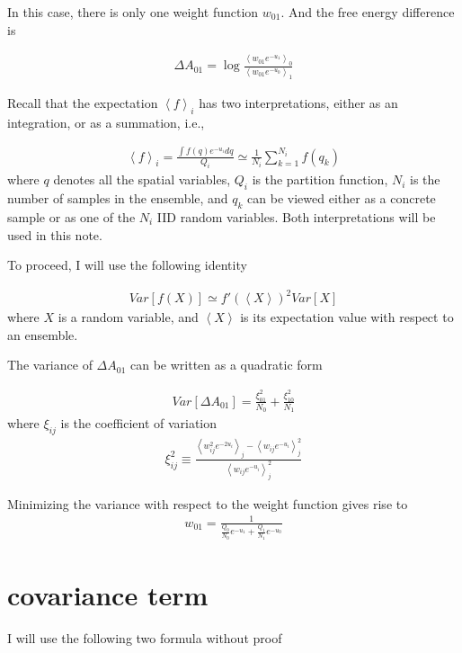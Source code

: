 \documentclass[notitlepage, amsmath, amssymb, aps]{revtex4-1}
\begin{document}
In this case, there is only one weight function $w_{01}$. And the free energy difference is

\begin{align}
    \Delta A_{01} = \log\frac{\left<w_{01}e^{-u_1}\right>_0}{\left<w_{01}e^{-u_0}\right>_1}
\end{align}

Recall that the expectation $\left<f\right>_i$ has two interpretations, either as an integration, or as a summation, i.e.,

\begin{align}
    \left<f\right>_i = \frac{\int f(q) e^{-u_i} dq}{Q_i} \simeq \frac{1}{N_i} \sum_{k=1}^{N_i}f(q_k) \label{eq:avg}
\end{align}
where $q$ denotes all the spatial variables, $Q_i$ is the partition function,
$N_i$ is the number of samples in the ensemble,
and $q_k$ can be viewed either as a concrete sample or as one of the $N_i$ IID random variables.
Both interpretations will be used in this note.

To proceed, I will use the following identity

\begin{align}
    Var[f(X)]\simeq f'(\left<X\right>)^2Var[X]
\end{align}
where $X$ is a random variable, and $\left<X\right>$ is its expectation value with respect to an ensemble.

The variance of $\Delta A_{01}$ can be written as a quadratic form

\begin{align}
    Var[\Delta A_{01}] = \frac{\xi^2_{01}}{N_0} + \frac{\xi^2_{10}}{N_1}
\end{align}
where $\xi_{ij}$ is the coefficient of variation
\begin{align}
    \xi_{ij}^2 \equiv \frac{\left<w_{ij}^2e^{-2u_i}\right>_j - \left<w_{ij}e^{-u_i}\right>_j^2}{\left<w_{ij}e^{-u_i}\right>_j^2}
\end{align}

Minimizing the variance with respect to the weight function gives rise to
\begin{align}
    w_{01} = \frac{1}{\frac{Q_0}{N_0}e^{-u_1} + \frac{Q_1}{N_1}e^{-u_0}}
\end{align}

\section{covariance term}
I will use the following two formula without proof
\end{document}
